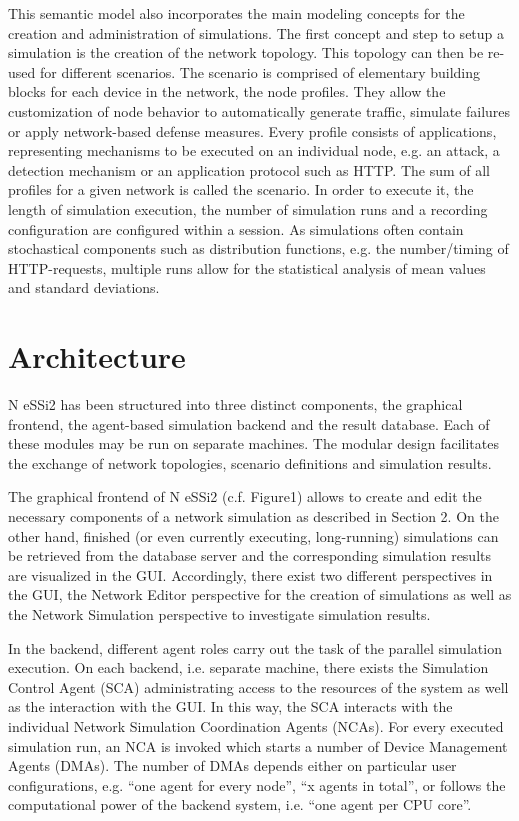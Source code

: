 \documentclass[sigconf]{aamas}
\begin{document}
This semantic model also incorporates the main modeling concepts for the creation and administration of simulations.
The first concept and step to setup a simulation is the creation of the network topology. This topology can then be re-used for different scenarios. The scenario is comprised of elementary building blocks for each device in the network, the node profiles. They allow the customization of node behavior to automatically generate traffic, simulate failures or apply network-based defense measures. Every profile consists of applications, representing mechanisms to be executed on an individual node, e.g. an attack, a detection mechanism or an application protocol such as HTTP. The sum of all profiles for a given network is called the scenario. In order to execute it, the length of simulation execution, the number of simulation runs and a recording configuration are configured within a session. As simulations often contain stochastical components such as distribution functions, e.g. the number/timing of HTTP-requests, multiple runs allow for the statistical analysis of mean values and standard deviations.


\section{Architecture}

N eSSi2 has been structured into three distinct components, the graphical frontend, the agent-based simulation backend and the result database. Each of these modules may be run on separate machines. The modular design facilitates the exchange of network topologies, scenario definitions and simulation results.

The graphical frontend of N eSSi2 (c.f. Figure1) allows to create and edit the necessary components of a network simulation as described in Section 2. On the other hand, finished (or even currently executing, long-running) simulations can be retrieved from the database server and the corresponding simulation results are visualized in the GUI. Accordingly, there exist two different perspectives in the GUI, the Network Editor perspective for the creation of simulations as well as the Network Simulation perspective to investigate simulation results.

In the backend, different agent roles carry out the task of the parallel simulation execution. On each backend, i.e. separate machine, there exists the Simulation Control Agent (SCA) administrating access to the resources of the system as well as the interaction with the GUI. In this way, the SCA interacts with the individual Network Simulation Coordination Agents (NCAs). For every executed simulation run, an NCA is invoked which starts a number of Device Management Agents (DMAs). The number of DMAs depends either on particular user configurations, e.g. “one agent for every node”, “x agents in total”, or follows the computational power of the backend system, i.e. “one agent per CPU core”.
\end{document}
